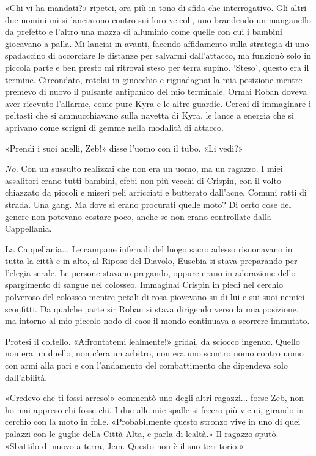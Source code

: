 «Chi vi ha mandati?» ripetei, ora più in tono di sfida che
interrogativo. Gli altri due uomini mi si lanciarono contro sui loro
veicoli, uno brandendo un manganello da prefetto e l'altro una mazza di
alluminio come quelle con cui i bambini giocavano a palla. Mi lanciai in
avanti, facendo affidamento sulla strategia di uno spadaccino di
accorciare le distanze per salvarmi dall'attacco, ma funzionò solo in
piccola parte e ben presto mi ritrovai steso per terra supino. `Steso',
questo era il termine. Circondato, rotolai in ginocchio e riguadagnai la
mia posizione mentre premevo di nuovo il pulsante antipanico del mio
terminale. Ormai Roban doveva aver ricevuto l'allarme, come pure Kyra e
le altre guardie. Cercai di immaginare i peltasti che si ammucchiavano
sulla navetta di Kyra, le lance a energia che si aprivano come scrigni
di gemme nella modalità di attacco.

«Prendi i suoi anelli, Zeb!» disse l'uomo con il tubo. «Li vedi?»

\emph{No.} Con un sussulto realizzai che non era un uomo, ma un ragazzo.
I miei assalitori erano tutti bambini, efebi non più vecchi di Crispin,
con il volto chiazzato da piccoli e miseri peli arricciati e butterato
dall'acne. Comuni ratti di strada. Una gang. Ma dove si erano procurati
quelle moto? Di certo cose del genere non potevano costare poco, anche
se non erano controllate dalla Cappellania.

La Cappellania... Le campane infernali del luogo sacro adesso
risuonavano in tutta la città e in alto, al Riposo del Diavolo, Eusebia
si stava preparando per l'elegia serale. Le persone stavano pregando,
oppure erano in adorazione dello spargimento di sangue nel colosseo.
Immaginai Crispin in piedi nel cerchio polveroso del colosseo mentre
petali di rosa piovevano su di lui e sui suoi nemici sconfitti. Da
qualche parte sir Roban si stava dirigendo verso la mia posizione, ma
intorno al mio piccolo nodo di caos il mondo continuava a scorrere
immutato.

Protesi il coltello. «Affrontatemi lealmente!» gridai, da sciocco
ingenuo. Quello non era un duello, non c'era un arbitro, non era uno
scontro uomo contro uomo con armi alla pari e con l'andamento del
combattimento che dipendeva solo dall'abilità.

«Credevo che ti fossi arreso!» commentò uno degli altri ragazzi... forse
Zeb, non ho mai appreso chi fosse chi. I due alle mie spalle si fecero
più vicini, girando in cerchio con la moto in folle. «Probabilmente
questo stronzo vive in uno di quei palazzi con le guglie della Città
Alta, e parla di lealtà.» Il ragazzo sputò. «Sbattilo di nuovo a terra,
Jem. Questo non è il suo territorio.»

